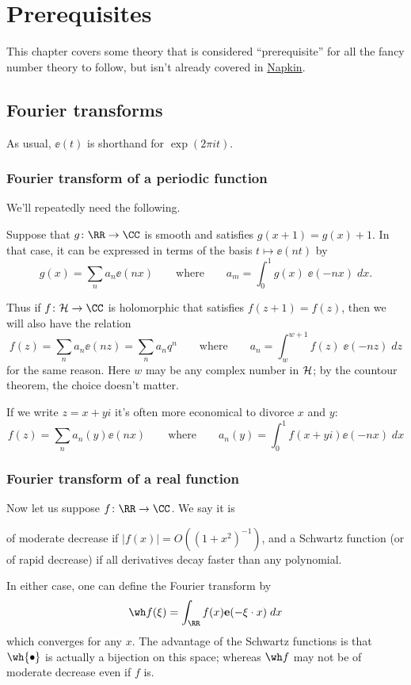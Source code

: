\chapter{Prerequisites}
This chapter covers some theory that is considered ``prerequisite''
for all the fancy number theory to follow, but isn't already covered
in \href{https://web.evanchen.cc/napkin.html}{Napkin}.

\section{Fourier transforms}
As usual, $\ee(t)$ is shorthand for $\exp(2\pi i t)$.

\subsection{Fourier transform of a periodic function}
We'll repeatedly need the following.
\begin{theorem}
Suppose that $g \colon \RR \to \CC$
is smooth and satisfies $g(x+1) = g(x) + 1$.
In that case, it can be expressed
in terms of the basis $t \mapsto \ee(nt)$ by
\[
  g(x) = \sum_n a_n \ee(nx)
  \qquad\text{where}\qquad
  a_m = \int_0^1 g(x) \; \ee(-nx) \; dx.
\]
\end{theorem}

Thus if $f \colon \HH \to \CC$ is holomorphic
that satisfies $f(z+1) = f(z)$,
then we will also have the relation
\[ f(z) = \sum_n a_n \ee(nz) = \sum_n a_n q^n
  \qquad\text{where}\qquad
  a_n = \int_w^{w+1} f(z) \; \ee(-nz) \; dz \]
for the same reason.
Here $w$ may be any complex number in $\mathcal H$;
by the countour theorem, the choice doesn't matter.

If we write $z = x+yi$ it's often
more economical to divorce $x$ and $y$:
\[ f(z) = \sum_n a_n(y) \ee(nx)
  \qquad\text{where}\qquad
  a_n(y) = \int_0^1 f(x+yi) \ee(-nx) \; dx \]

\subsection{Fourier transform of a real function}
Now let us suppose $f \colon \RR \to \CC$.
We say it is
\begin{itemize}
  \ii of \alert{moderate decrease}
  if $|f(x)| = O( (1+x^2)^{-1} )$, and
  \ii a \alert{Schwartz function} (or of rapid decrease)
  if all derivatives decay faster than any polynomial.
\end{itemize}
In either case,
one can define the Fourier transform by
\[ \wh f(\xi)
  = \int_\RR f(x) \ee(-\xi \cdot x) \; dx \]
which converges for any $x$.
The advantage of the Schwartz functions is that
$\wh{\bullet}$ is actually a bijection on this space;
whereas $\wh f$ may not be of moderate decrease
even if $f$ is.

